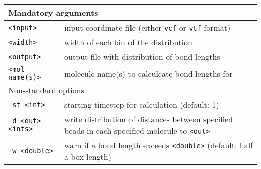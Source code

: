 \noindent
\begin{longtable}{p{}p{}}
  \toprule
  \multicolumn{2}{l}{Mandatory arguments} \\
  \midrule
  \texttt{<input>} & input coordinate file (either \texttt{vcf} or
    \texttt{vtf} format) \\
  \texttt{<width>} & width of each bin of the distribution \\
  \texttt{<output>} & output file with distribution of bond lengths \\
  \texttt{<mol name(s)>} & molecule name(s) to calculcate bond lengths for \\
  \toprule
  \multicolumn{2}{l}{Non-standard options} \\
  \midrule
  \texttt{-st <int>} & starting timestep for calculation (default: 1) \\
  \texttt{-d <out> <ints>} & write distribution of distances
    between specified beads in each specified molecule to \texttt{<out>}\\
  \texttt{-w <double>} & warn if a bond length exceeds \texttt{<double>}
    (default: half a box length)\\
  \bottomrule
\end{longtable}

